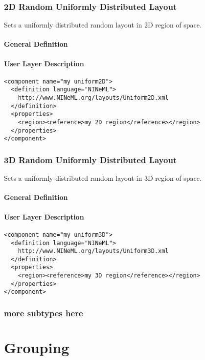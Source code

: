 \documentclass{article}
\begin{document}
\subsubsection{2D Random Uniformly Distributed Layout}

Sets a uniformly distributed random layout in 2D region of space.

\paragraph{General Definition}

\paragraph{User Layer Description}
\begin{verbatim}
<component name="my uniform2D">
  <definition language="NINeML">
    http://www.NINeML.org/layouts/Uniform2D.xml
  </definition>
  <properties>
    <region><reference>my 2D region</reference></region>
  </properties>
</component>
\end{verbatim}

\subsubsection{3D Random Uniformly Distributed Layout}

Sets a uniformly distributed random layout in 3D region of space.

\paragraph{General Definition}

\paragraph{User Layer Description}
\begin{verbatim}
<component name="my uniform3D">
  <definition language="NINeML">
    http://www.NINeML.org/layouts/Uniform3D.xml
  </definition>
  <properties>
    <region><reference>my 3D region</reference></region>
  </properties>
</component>
\end{verbatim}

\subsubsection{more subtypes here}

\section{Grouping}
\label{grouping}
\end{document}
